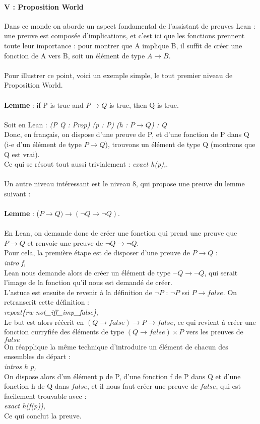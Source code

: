 \documentclass[french,frenchkw]{article}
\begin{document}
\paragraph{V : Proposition World} 
Dans ce monde on aborde un aspect fondamental de l'assistant de preuves Lean : une preuve est composée d'implications, et c'est ici que les fonctions prennent toute leur importance : pour montrer que A implique B, il suffit de créer une fonction de A vers B, soit un élément de type $A \to B$.\\
\\
Pour illustrer ce point, voici un exemple simple, le tout premier niveau de Proposition World. \\ \\
\textbf{Lemme} : if P is true and $P \to Q$ is true, then Q is true. \\ \\
Soit en Lean : \textit{(P Q : Prop) (p : P) (h : $P \to Q$) : Q} \\
Donc, en français, on dispose d'une preuve de P, et d'une fonction de P dans Q (i-e d'un élément de type $P \to Q$), trouvons un élément de type Q (montrons que Q est vrai). \\
Ce qui se résout tout aussi trivialement : \textit{exact h(p),}.\\
\\
Un autre niveau intéressant est le niveau 8, qui propose une preuve du lemme suivant : \\
\\
\textbf{Lemme} : ($P \to Q) \to (\lnot Q \to \lnot Q)$. \\
\\
En Lean, on demande donc de créer une fonction qui prend une preuve que $P \to Q$ et renvoie une preuve de $\lnot Q \to \lnot Q$.
\\
Pour cela, la première étape est de disposer d'une preuve de $P \to Q$ :\\
\textit{intro f,}\\
Lean nous demande alors de créer un élément de type $\lnot Q \to \lnot Q$, qui serait l'image de la fonction qu'il nous est demandé de créer.\\
L'astuce est ensuite de revenir à la définition de $\lnot P$ : $\lnot P$ ssi $P \to false$. On retranscrit cette définition : \\
\textit{repeat\{rw not\_iff\_imp\_false\},} \\
Le but est alors réécrit en $(Q \to false) \to P \to false$, ce qui revient à créer une fonction curryfiée des éléments de type $(Q \to false) \times P$ vers les preuves de $false$\\
On réapplique la même technique d'introduire un élément de chacun des ensembles de départ : \\
\textit{intros h p,}\\
On dispose alors d'un élément p de P, d'une fonction f de P dans Q et d'une fonction h de Q dans $false$, et il nous faut créer une preuve de $false$, qui est facilement trouvable avec : \\
\textit{exact h(f(p)),}\\
Ce qui conclut la preuve.
\end{document}
